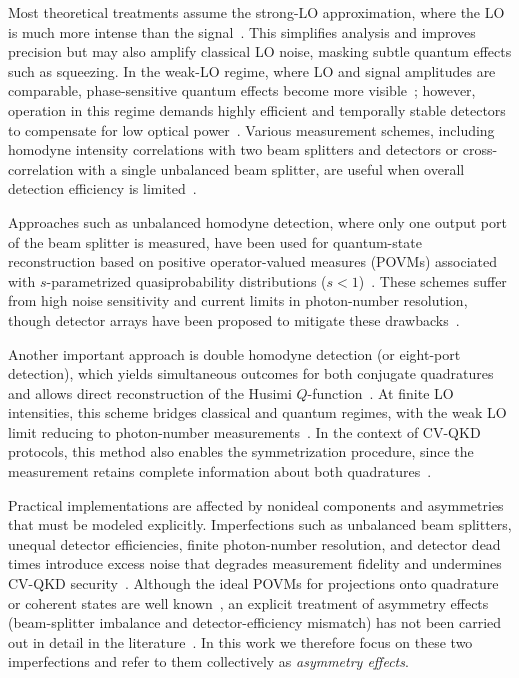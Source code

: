 \documentclass[%
reprint,
superscriptaddress,
 amsmath,amssymb,amsfonts,
 aps,
 pra,
 longbibliography
]{revtex4-2}
\begin{document}
Most theoretical treatments assume the strong-LO approximation, where the LO is much more intense than the signal~\cite{Vogel:bk:2006}. This simplifies analysis and improves precision but may also amplify classical LO noise, masking subtle quantum effects such as squeezing. In the weak-LO regime, where LO and signal amplitudes are comparable, phase-sensitive quantum effects become more visible~\cite{PhysRevA.51.4160}; however, operation in this regime demands highly efficient and temporally stable detectors to compensate for low optical power~\cite{PhysRevA.51.4160,Schumaker:84}. Various measurement schemes, including homodyne intensity correlations with two beam splitters and detectors or cross-correlation with a single unbalanced beam splitter, are useful when overall detection efficiency is limited~\cite{PhysRevA.51.4160}.

Approaches such as unbalanced homodyne detection, where only one output port of the beam splitter is measured, have been used for quantum-state reconstruction based on positive operator-valued measures (POVMs) associated with $s$-parametrized quasiprobability distributions ($s<1$)~\cite{PhysRevA.53.4528}. These schemes suffer from high noise sensitivity and current limits in photon-number resolution, though detector arrays have been proposed to mitigate these drawbacks~\cite{PhysRevA.101.031801,PhysRevA.85.023820,PhysRevA.92.053835}.

Another important approach is double homodyne detection (or eight-port detection), which yields simultaneous outcomes for both conjugate quadratures and allows direct reconstruction of the Husimi $Q$-function~\cite{Richter:98,PhysRevA.101.031801}. At finite LO intensities, this scheme bridges classical and quantum regimes, with the weak LO limit reducing to photon-number measurements~\cite{Cives_Esclop_2000}. In the context of CV-QKD protocols, this method also enables the symmetrization procedure, since the measurement retains complete information about both quadratures~\cite{PhysRevLett.118.200501}.


Practical implementations are affected by nonideal components and asymmetries that must be modeled explicitly. Imperfections such as unbalanced beam splitters, unequal detector efficiencies, finite photon-number resolution, and detector dead times introduce excess noise that degrades measurement fidelity and undermines CV-QKD security~\cite{PhysRevA.53.4528,len2022realistic,yeremenko2024realistic,reutov2021photon,hajomer2025finite,ruiz2023effects,Wang:23}. Although the ideal POVMs for projections onto quadrature or coherent states are well known~\cite{Vogel:bk:2006,Richter:98}, an explicit treatment of asymmetry effects (beam-splitter imbalance and detector-efficiency mismatch) has not been carried out in detail in the literature~\cite{PhysRevA.85.023820,PhysRevA.92.053835}. In this work we therefore focus on these two imperfections and refer to them collectively as \textit{asymmetry effects}.
\end{document}
